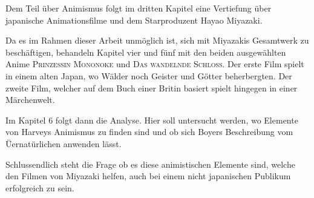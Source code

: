Dem Teil über Animismus folgt im dritten Kapitel eine Vertiefung über japanische Animationsfilme und dem Starproduzent Hayao Miyazaki.

Da es im Rahmen dieser Arbeit unmöglich ist, sich mit Miyazakis Gesamtwerk zu beschäftigen, behandeln Kapitel vier und fünf mit den beiden ausgewählten Anime \textsc{Prinzessin Mononoke} und \textsc{Das wandelnde Schloss}. Der erste Film spielt in einem alten Japan, wo Wälder noch Geister und Götter beherbergten. Der zweite Film, welcher auf dem Buch einer Britin basiert spielt hingegen in einer Märchenwelt.

Im Kapitel 6 folgt dann die Analyse. Hier soll untersucht werden, wo Elemente von Harveys Animismus zu finden sind und ob sich Boyers Beschreibung vom Üernatürlichen anwenden lässt.

Schlussendlich steht die Frage ob es diese animistischen Elemente sind, welche den Filmen von Miyazaki helfen, auch bei einem nicht japanischen Publikum erfolgreich zu sein.